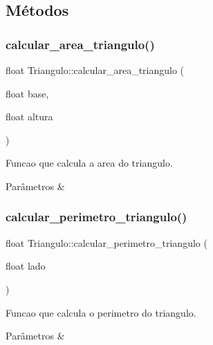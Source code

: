 \subsection{Métodos}
\mbox{\label{classTriangulo_a4c849485ba611cfeadc46030687bf74f}} 
\subsubsection{\texorpdfstring{calcular\+\_\+area\+\_\+triangulo()}{calcular\_area\_triangulo()}}
{\footnotesize\ttfamily float Triangulo\+::calcular\+\_\+area\+\_\+triangulo (\begin{DoxyParamCaption}\item[{float}]{base,  }\item[{float}]{altura }\end{DoxyParamCaption})}



Funcao que calcula a area do triangulo. 


\begin{DoxyParams}{Parâmetros}
{\em } & \\
\hline
\end{DoxyParams}
\mbox{\label{classTriangulo_a95408e4018c121b3ef88b3c44a4e3607}} 
\subsubsection{\texorpdfstring{calcular\+\_\+perimetro\+\_\+triangulo()}{calcular\_perimetro\_triangulo()}}
{\footnotesize\ttfamily float Triangulo\+::calcular\+\_\+perimetro\+\_\+triangulo (\begin{DoxyParamCaption}\item[{float}]{lado }\end{DoxyParamCaption})}



Funcao que calcula o perimetro do triangulo. 


\begin{DoxyParams}{Parâmetros}
{\em } & \\
\hline
\end{DoxyParams}
\mbox{\label{classTriangulo_a1ba1414ed8d54f57ef3d0849857cfeb7}} 
